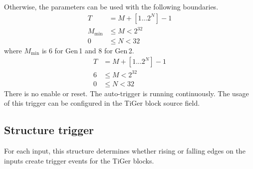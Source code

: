 \begin{description}[style=nextline]
{{            Otherwise, the parameters can be used with the following boundaries.
            \begin{align*}
                T &= M + [1...2^N] - 1\\
                M_{\mathrm{min}} &\leq M < 2^{32}\\
                0 &\leq N < 32
            \end{align*}
            where $M_{\mathrm{min}}$ is 6 for Gen\,1 and 8 for Gen\,2.
       }{%
            \begin{align*}
                T &= M + [1...2^N] - 1\\
                6 &\leq M < 2^{32}\\
                0 &\leq N < 32
            \end{align*} 
        }
        \noindent There is no enable or reset. The auto-trigger is running
        continuously.  The usage of this trigger can be configured in the
        TiGer block source field.
    }
    \end{description}


\subsection{Structure \prefix trigger}
\label{structtrigger}
For each input, this structure determines whether rising or falling edges on
the inputs create trigger events for the TiGer blocks.

